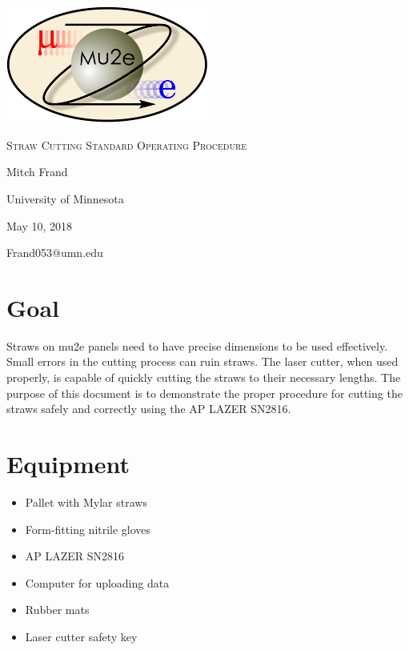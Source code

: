\documentclass[A4,12pt]{article}
\begin{document}
\begin{titlepage}
	\centering
	\includegraphics[width=0.5\textwidth]{mu2e_logo_oval.png}\par\vspace{2cm}
	{\scshape\LARGE Straw Cutting Standard Operating Procedure\par}
	\vspace{3cm}
	{\Large Mitch Frand\par}
	\vspace{3cm}
	{\large University of Minnesota\par}
 	\vspace{.5cm}
	{\large May 10, 2018\par}
	\vfill
	{Frand053@umn.edu\par}
\end{titlepage}

\clearpage
\setcounter{page}{2}
\newenvironment{myitemize} %
{ \begin{itemize}
    \setlength{\itemsep}{4pt}
    \setlength{\parskip}{0pt}
    \setlength{\parsep}{0pt}     }
{ \end{itemize}                  } 

\section{Goal}
Straws on mu2e panels need to have precise dimensions to be used effectively.  Small errors in the cutting process can ruin straws.  The laser cutter, when used properly, is capable of quickly cutting the straws to their necessary lengths.  The purpose of this document is to demonstrate the proper procedure for cutting the straws safely and correctly using the AP LAZER SN2816.


\section{Equipment}
\begin{multicols}{2}
\begin{myitemize}
	\item Pallet with Mylar straws
	\item Form-fitting nitrile gloves
    \item AP LAZER SN2816
    \item Computer for uploading data 
    \item Rubber mats
    \item Laser cutter safety key
\end{myitemize}
\end{multicols}
\end{document}
